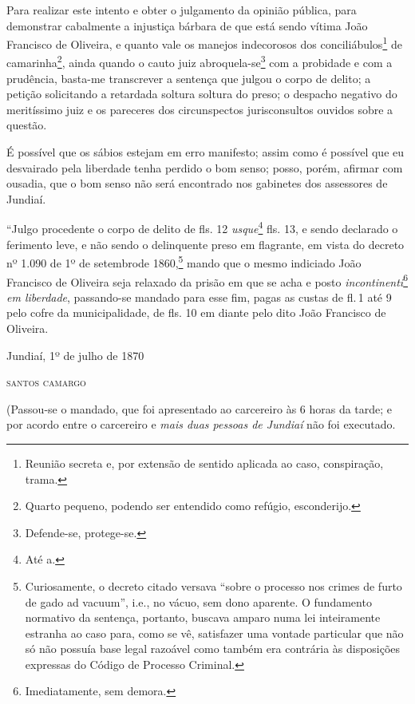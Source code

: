 Para realizar este intento e obter o julgamento da opinião pública, para
demonstrar cabalmente a injustiça bárbara de que está sendo vítima João
Francisco de Oliveira, e quanto vale os manejos indecorosos dos
conciliábulos\footnote{ Reunião secreta e, por extensão de sentido
  aplicada ao caso, conspiração, trama.} de camarinha\footnote{ Quarto
  pequeno, podendo ser entendido como refúgio, esconderijo.}, ainda
quando o cauto juiz abroquela-se\footnote{ Defende-se, protege-se.} com
a probidade e com a prudência, basta-me transcrever a sentença que
julgou o corpo de delito; a petição solicitando a retardada soltura
soltura do preso; o despacho negativo do meritíssimo juiz e os pareceres
dos circunspectos jurisconsultos ouvidos sobre a questão.

É possível que os sábios estejam em erro manifesto; assim como é
possível que eu desvairado pela liberdade tenha perdido o bom senso;
posso, porém, afirmar com ousadia, que o bom senso não será encontrado
nos gabinetes dos assessores de Jundiaí.

\asterisc{}

``Julgo procedente o corpo de delito de fls. 12 \emph{usque}\footnote{
  Até a.} fls. 13, e sendo declarado o ferimento leve, e não sendo o
delinquente preso em flagrante, em vista do decreto nº 1.090 de 1º de
setembrode 1860,\footnote{ Curiosamente, o decreto citado versava
  ``sobre o processo nos crimes de furto de gado ad vacuum'', i.e., no
  vácuo, sem dono aparente. O fundamento normativo da sentença,
  portanto, buscava amparo numa lei inteiramente estranha ao caso para,
  como se vê, satisfazer uma vontade particular que não só não possuía
  base legal razoável como também era contrária às disposições expressas
  do Código de Processo Criminal.} mando que o mesmo indiciado João
Francisco de Oliveira seja relaxado da prisão em que se acha e posto
\emph{incontinenti}\footnote{ Imediatamente, sem demora.} \emph{em
liberdade}, passando-se mandado para esse fim, pagas as custas de fl.\,1
até 9 pelo cofre da municipalidade, de fls. 10 em diante pelo dito João
Francisco de Oliveira.

\begin{flushright}
Jundiaí, 1º de julho de 1870

\textsc{santos camargo}
\end{flushright}

(Passou-se o mandado, que foi apresentado ao carcereiro às 6 horas da
tarde; e por acordo entre o carcereiro e \emph{mais duas pessoas de
Jundiaí} não foi executado.

